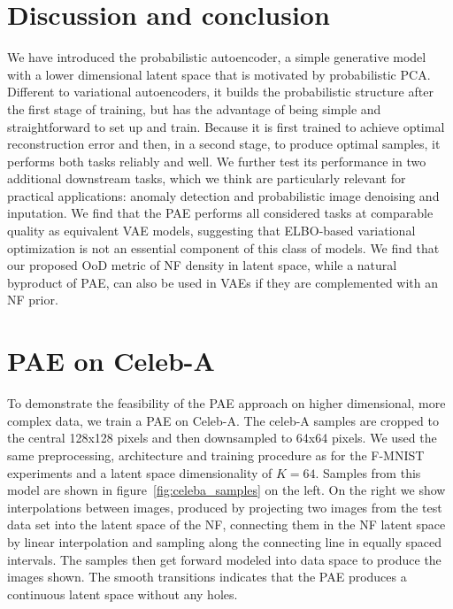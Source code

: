 \documentclass[10pt]{article} \usepackage[accepted]{tmlr}
\newcommand{\rev}[1]{{\color{black}#1}}
\begin{document}
\section{Discussion and conclusion}
We have introduced the probabilistic autoencoder, a simple generative model with a lower dimensional latent space that is motivated by probabilistic PCA. Different to variational autoencoders, it builds 
the probabilistic structure after the 
first stage of training, but 
has the advantage of being simple and straightforward to set up and train. Because it is first trained to achieve optimal reconstruction error and then, in a second stage, to produce optimal samples, it performs both tasks reliably and well.  We further test its performance in two additional downstream tasks, which we think are particularly relevant for practical applications: anomaly detection and probabilistic image denoising and inputation. 
We find that the PAE performs all considered tasks at comparable quality as equivalent VAE models, suggesting that 
ELBO-based variational optimization is not 
an essential component of this class of models. We find that our proposed OoD metric of NF density in latent space, 
while a natural byproduct of PAE, can also 
be used in VAEs if they are complemented with an NF prior.
  

\appendix

\section{PAE on Celeb-A}
\label{app:celba}
To demonstrate the feasibility of the PAE approach on higher dimensional, more complex data, we train a PAE on Celeb-A. The celeb-A samples are cropped to the central 128x128 pixels and then downsampled to 64x64 pixels. We used the same preprocessing, architecture and training procedure as for the F-MNIST experiments and a latent space dimensionality of $K=64$. Samples from this model are shown in figure~\ref{fig:celeba_samples} on the left. On the right we show interpolations between images, produced by projecting two images from the test data set into the latent space of the NF, connecting them in the NF latent space by \rev{linear interpolation and sampling along the connecting line} in equally spaced intervals. The samples then get forward modeled into data space to produce the images shown. The smooth transitions indicates that the PAE produces a continuous latent space without any holes.  
\end{document}
